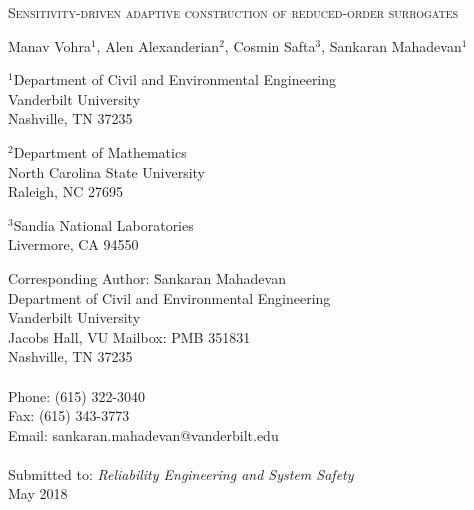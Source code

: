 \begin{center}
\textsc{
Sensitivity-driven adaptive construction of reduced-order surrogates
}

\bigskip 
\bigskip 

Manav Vohra$^{1}$, Alen Alexanderian$^{2}$, Cosmin Safta$^{3}$, Sankaran Mahadevan$^{1}$

\bigskip
\bigskip

\normalsize
$^1$Department of Civil and Environmental Engineering\\
Vanderbilt University\\
Nashville, TN 37235\\

\bigskip

$^2$Department of Mathematics\\
North Carolina State University\\
Raleigh, NC 27695\\

\bigskip

$^3$Sandia National Laboratories\\
Livermore, CA 94550\\

\end{center}

\vspace{6cm}

\begin{tabbing}
Corresponding Author: \hspace{5mm} \= Sankaran Mahadevan\\
       \>  Department of Civil and Environmental Engineering\\
       \>  Vanderbilt University\\
        Jacobs Hall, VU Mailbox: PMB 351831 \\
       \>  Nashville, TN 37235 \\
       \> \\
Phone: \> (615) 322-3040 \\
Fax:   \> (615) 343-3773 \\
Email: \>  sankaran.mahadevan@vanderbilt.edu   \\
\\
Submitted to: \> \textit{Reliability Engineering and System Safety} \\
\>  May 2018\\

\bigskip
\end{tabbing}

\clearpage

